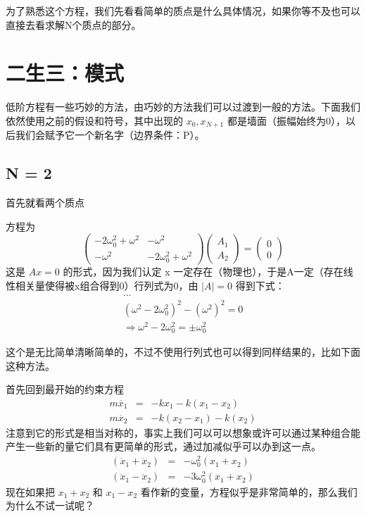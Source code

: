 \documentclass[11pt]{book}
\begin{document}
为了熟悉这个方程，我们先看看简单的质点是什么具体情况，如果你等不及也可以直接去看求解N个质点的部分。

\section{二生三：模式}
\label{sec:orgfb0ef18}
低阶方程有一些巧妙的方法，由巧妙的方法我们可以过渡到一般的方法。下面我们依然使用之前的假设和符号，其中出现的 \(x_0,x_{N+1}\) 都是墙面（振幅始终为0），以后我们会赋予它一个新名字（边界条件：P）。
\subsection{N = 2}
\label{sec:orgc400620}
首先就看两个质点

方程为
\begin{equation}
\label{eq:10}
\begin{pmatrix}
-2\omega_{0}^2+\omega^{2} & -\omega^{2}\\
-\omega^2 & -2\omega_0^2+\omega^{2}
\end{pmatrix}
\begin{pmatrix}
A_1\\A_2
\end{pmatrix}
=
\begin{pmatrix}
0\\0
\end{pmatrix}
\end{equation}
这是 \(Ax=0\) 的形式，因为我们认定 x 一定存在（物理也），于是A一定（存在线性相关量使得被x组合得到0）行列式为0，由 \(\left| A \right|=0\) 得到下式：
\begin{eqnarray}
\label{eq:16}
...\\
(\omega^2-2\omega_0^2)^2-(\omega^2)^2=0\\
\Rightarrow \omega^2-2\omega_0^2=\pm \omega_0^{2}
\end{eqnarray}

这个是无比简单清晰简单的，不过不使用行列式也可以得到同样结果的，比如下面这种方法。

首先回到最开始的约束方程
\begin{eqnarray}
\label{eq:25}
m\ddot{x_1} &=  &-kx_1-k(x_1-x_2) \\
m\ddot{x_2} & = &-k(x_2-x_1)-k(x_2)
\end{eqnarray}
注意到它的形式是相当对称的，事实上我们可以可以想象或许可以通过某种组合能产生一些新的量它们具有更简单的形式，通过加减似乎可以办到这一点。
\begin{eqnarray}
\label{eq:26}
(\ddot{x}_1+\ddot{x}_2) & = & -\omega_0^2(x_1+x_2)\\
(\ddot{x}_1-\ddot{x}_2) & = & -3\omega^{2}_0(x_1+x_2)
\end{eqnarray}
现在如果把 \(x_1+x_2\) 和 \(x_1-x_2\) 看作新的变量，方程似乎是非常简单的，那么我们为什么不试一试呢？
\end{document}

